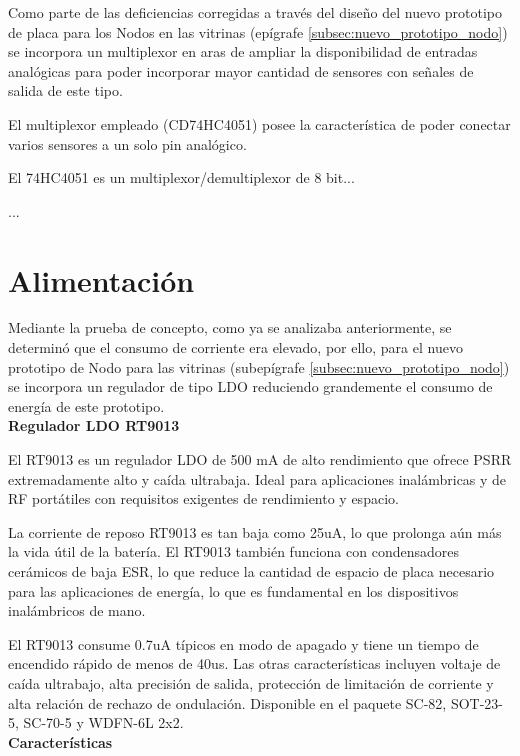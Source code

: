 Como parte de las deficiencias corregidas a través del diseño del nuevo prototipo de placa para los Nodos en las vitrinas (epígrafe \ref{subsec:nuevo_prototipo_nodo}) se incorpora un multiplexor en aras de ampliar la disponibilidad
de entradas analógicas para poder incorporar mayor cantidad de sensores con señales de salida de este tipo.

El multiplexor empleado (CD74HC4051) posee la característica de poder conectar varios sensores a un solo pin analógico.

El 74HC4051 es un multiplexor/demultiplexor de 8 bit...

...



\section{Alimentación}

Mediante la prueba de concepto, como ya se analizaba anteriormente, se determinó que el consumo de corriente era elevado, por ello, para el nuevo prototipo de Nodo para las vitrinas (subepígrafe \ref{subsec:nuevo_prototipo_nodo}) se 
incorpora un regulador de tipo LDO reduciendo grandemente el consumo de energía de este prototipo.\\

\textbf{Regulador LDO RT9013}

El RT9013 es un regulador LDO de 500 mA de alto rendimiento que ofrece PSRR extremadamente alto y caída ultrabaja. Ideal para aplicaciones inalámbricas y de RF portátiles con requisitos exigentes de rendimiento y espacio.

La corriente de reposo RT9013 es tan baja como 25uA, lo que prolonga aún más la vida útil de la batería. El RT9013 también funciona con condensadores cerámicos de baja ESR, lo que reduce la cantidad de espacio de placa necesario para las aplicaciones de energía, lo que es fundamental en los dispositivos inalámbricos de mano.

El RT9013 consume 0.7uA típicos en modo de apagado y tiene un tiempo de encendido rápido de menos de 40us. Las otras características incluyen voltaje de caída ultrabajo, alta precisión de salida, protección de limitación de corriente y alta relación de rechazo de ondulación. Disponible en el paquete SC-82, SOT-23-5, SC-70-5 y WDFN-6L 2x2.\\

\textbf{Características}

